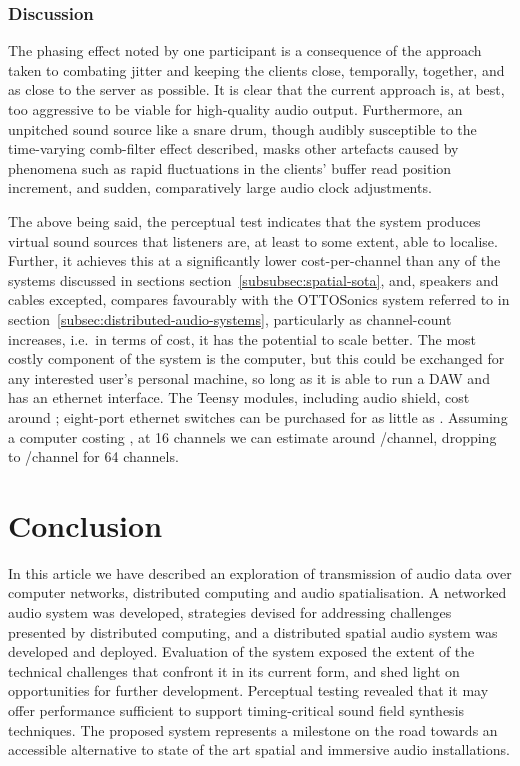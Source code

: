 \documentclass[utf8]{FrontiersinHarvard}
\newcommand{\secref}[1]{section~\ref{#1}}
\begin{document}
    \subsubsection{Discussion}\label{subsubsec:discussion-percep}

    The phasing effect noted by one participant is a consequence of the approach
    taken to combating jitter and keeping the clients close, temporally, together,
    and as close to the server as possible.
    It is clear that the current approach is, at best, too aggressive to be viable
    for high-quality audio output.
    Furthermore, an unpitched sound source like a snare drum, though audibly
    susceptible to the time-varying comb-filter effect described, masks other
    artefacts caused by phenomena such as rapid fluctuations in the clients' buffer
    read position increment, and sudden, comparatively large audio clock
    adjustments.

    The above being said, the perceptual test indicates that the system produces
    virtual sound sources that listeners are, at least to some extent, able to
    localise.
    Further, it achieves this at a significantly lower cost-per-channel than any of
    the systems discussed in sections \secref{subsubsec:spatial-sota}, and, speakers
    and cables excepted, compares favourably with the OTTOSonics system referred to
    in \secref{subsec:distributed-audio-systems}, particularly as channel-count
    increases, i.e.\ in terms of cost, it has the potential to scale better.
    The most costly component of the system is the computer, but this could be
    exchanged for any interested user's personal machine, so long as it is able to
    run a DAW and has an ethernet interface.
    The Teensy modules, including audio shield, cost around ;
    eight-port ethernet switches can be purchased for as little as .
    Assuming a computer costing , at 16 channels we can estimate
    around /channel, dropping to /channel for 64
    channels.


    \section{Conclusion}\label{sec:conclusion}

    In this article we have described an exploration of transmission of audio data
    over computer networks, distributed computing and audio spatialisation.
    A networked audio system was developed, strategies devised for
    addressing challenges presented by distributed computing, and a distributed
    spatial audio system was developed and deployed.
    Evaluation of the system exposed the extent of the technical challenges
    that confront it in its current form, and shed light on opportunities for
    further development.
    Perceptual testing revealed that it may offer performance sufficient to support
    timing-critical sound field synthesis techniques.
    The proposed system represents a milestone on the road towards an accessible
    alternative to state of the art spatial and immersive audio installations.
\end{document}

